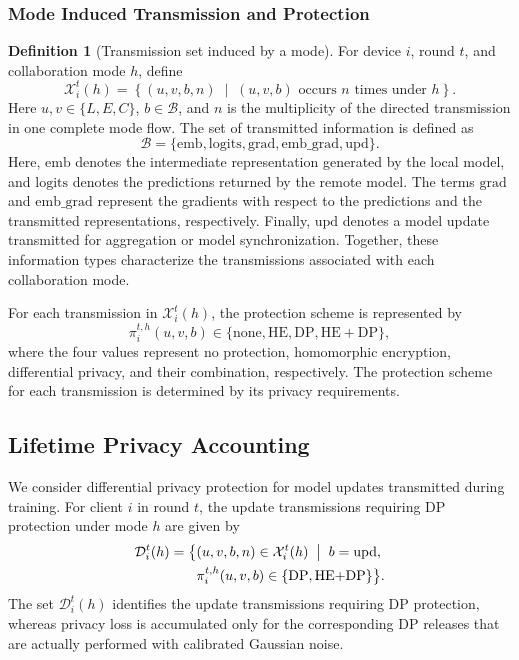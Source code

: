 \documentclass[5p,times]{elsarticle}
\theoremstyle{plain}
\theoremstyle{definition}
\newtheorem{definition}[theorem]{Definition}
\theoremstyle{remark}
\begin{document}
\subsubsection{Mode Induced Transmission and Protection}
\begin{definition}[Transmission set induced by a mode]
For device \(i\), round \(t\), and collaboration
mode \(h\), define
\begin{equation}
\mathcal X_i^t(h)
=
\left\{
(u,v,b,n)
\;\middle|\;
(u,v,b)\text{ occurs }n\text{ times under }h
\right\}.
\label{eq:transmission_set}
\end{equation}
Here \(u,v\in\{L,E,C\}\), \(b\in\mathcal B\),
and \(n\) is the multiplicity of the directed
transmission in one complete mode flow.
The set of transmitted information is defined as
\begin{equation*}
\mathcal B=
\{\mathrm{emb},\mathrm{logits},\mathrm{grad},
\mathrm{emb\_grad},\mathrm{upd}\}.
\end{equation*}
Here, \(\mathrm{emb}\) denotes the intermediate
representation generated by the local model,
and \(\mathrm{logits}\) denotes the predictions
returned by the remote model.
The terms \(\mathrm{grad}\) and
\(\mathrm{emb\_grad}\) represent the gradients
with respect to the predictions and the
transmitted representations, respectively.
Finally, \(\mathrm{upd}\) denotes a model
update transmitted for aggregation or
model synchronization.
Together, these information types characterize
the transmissions associated with each
collaboration mode.
\end{definition}
For each transmission in \(\mathcal X_i^t(h)\),
the protection scheme is represented by
\[
\pi_i^{t,h}(u,v,b)
\in
\{\mathrm{none},\mathrm{HE},\mathrm{DP},
\mathrm{HE{+}DP}\},
\]
where the four values represent no protection,
homomorphic encryption, differential privacy,
and their combination, respectively.
The protection scheme for each transmission
is determined by its privacy requirements.

\subsection{Lifetime Privacy Accounting}
\label{sec:privacy_model}

We consider differential privacy protection
for model updates transmitted during training.
For client \(i\) in round \(t\), the update
transmissions requiring DP protection under
mode \(h\) are given by
\begin{equation}
\begin{aligned}
\mathcal D_i^t(h)
=
\bigl\{
&(u,v,b,n)\in\mathcal X_i^t(h)
\;\bigm|\;
b=\mathrm{upd},\\
&\pi_i^{t,h}(u,v,b)
\in\{\mathrm{DP},\mathrm{HE{+}DP}\}
\bigr\}.
\end{aligned}
\label{eq:dp_exposures}
\end{equation}
The set \(\mathcal D_i^t(h)\) identifies
the update transmissions requiring DP protection,
whereas privacy loss is accumulated only for
the corresponding DP releases that are
actually performed with calibrated Gaussian noise.
\end{document}
